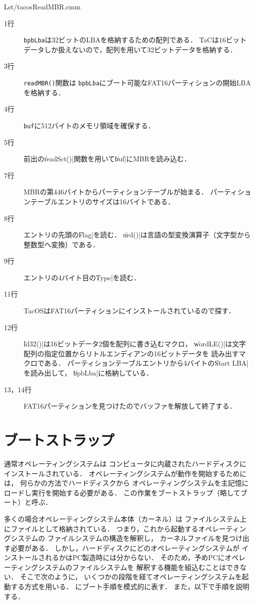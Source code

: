 
                {Lst/tacosReadMBR.cmm}

\begin{description}
\item[1行] \texttt{bpbLba}は32ビットのLBAを格納するための配列である．
  TaCは16ビットデータしか扱えないので，配列を用いて32ビットデータを格納する．
\item[3行] \texttt{readMBR()}関数は
  \texttt{bpbLba}にブート可能なFAT16パーティションの開始LBAを格納する．
\item[4行] \texttt{buf}に512バイトのメモリ領域を確保する．
\item[5行] 前出の\|readSct()|関数を用いて\|buf|にMBRを読み込む．
\item[7行] MBRの第446バイトからパーティションテーブルが始まる．
  パーティションテーブルエントリのサイズは16バイトである．
\item[8行] エントリの先頭の\|Flag|を読む．
  \|ord()|は\cmm 言語の型変換演算子（文字型から整数型へ変換）である．
\item[9行] エントリの4バイト目の\|Type|を読む．
\item[11行] TacOSはFAT16パーティションにインストールされているので探す．
\item[12行] \|ld32()|は16ビットデータ2個を配列に書き込むマクロ，
  \|wordLE()|は文字配列の指定位置からリトルエンディアンの16ビットデータを
  読み出すマクロである．
  パーティションテーブルエントリから4バイトの\|Start LBA|を読み出して，
  \|bpbLba|に格納している．
\item[13，14行] FAT16パーティションを見つけたのでバッファを解放して終了する．
\end{description}

\section{ブートストラップ}
通常オペレーティングシステムは
コンピュータに内蔵されたハードディスクにインストールされている．
オペレーティングシステムが動作を開始するためには，
何らかの方法でハードディスクから
オペレーティングシステムを主記憶にロードし実行を開始する必要がある．
この作業をブートストラップ（略してブート）と呼ぶ．

多くの場合オペレーティングシステム本体（カーネル）は
ファイルシステム上にファイルとして格納されている．
つまり，これから起動するオペレーティングシステムの
ファイルシステムの構造を解釈し，
カーネルファイルを見つけ出す必要がある．
しかし，ハードディスクにどのオペレーティングシステムが
インストールされるかはPC製造時には分からない．
そのため，予めPCにオペレーティングシステムのファイルシステムを
解釈する機能を組込むことはできない．
そこで次のように，
いくつかの段階を経てオペレーティングシステムを起動する方式を用いる．
にブート手順を模式的に表す．
また，以下で手順を説明する．


